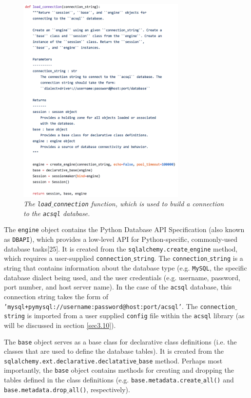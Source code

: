 \documentclass[10pt,journal,compsoc]{IEEEtran}
\begin{document}
\begin{figure}[!h]
\centering
\includegraphics[width=3.3in]{./figures/load_connection.png}
\caption{\textit{The \texttt{load$\_$connection} function, which is used to build a connection to the \texttt{acsql} database.}}
\label{fig12}
\end{figure}

The \texttt{engine} object contains the Python Database API Specification (also known as \texttt{DBAPI}), which provides a low-level API for Python-specific, commonly-used
database tasks[25].  It is created from the \texttt{sqlalchemy.create$\_$engine} method, which requires a user-supplied \texttt{connection$\_$string}.  The \texttt{connection$\_$string}
is a string that contains information about the database type (e.g. \texttt{MySQL}, the specific database dialect being used, and the user credentials (e.g. username, password, port number,
and host server name).  In the case of the \texttt{acsql} database, this connection string takes the form of \texttt{'mysql+pymysql://username:password@host:port/acsql'}.
The \texttt{connection$\_$string} is imported from a user supplied \texttt{config} file within the \texttt{acsql} library (as will be discussed in section \ref{sec3.10}).

The \texttt{base} object serves as a base class for declarative class definitions (i.e. the classes that are used to define the database tables).  It is created from the
\texttt{sqlalchemy.ext.declarative.declatative$\_$base} method.  Perhaps most importantly, the \texttt{base} object contains methods for creating and dropping the tables defined in
the class definitions (e.g. \texttt{base.metadata.create$\_$all()} and \texttt{base.metadata.drop$\_$all()}, respectively).
\end{document}
